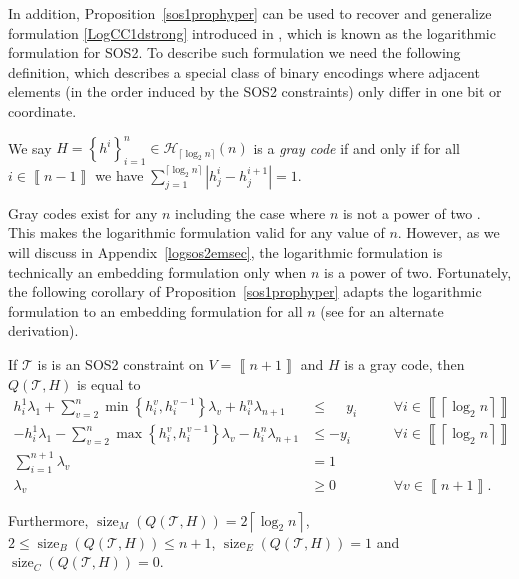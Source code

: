 \documentclass[mnsc]{informs3}
\newcommand{\set}[1]{\left\{#1\right\}}                     %
\newcommand{\abs}[1]{\left|#1\right|}                       %
\newcommand{\bra}[1]{\left(#1\right)}
\newcommand{\sidx}[1]{\left\llbracket     #1 \right\rrbracket}
\DeclareMathOperator{\size}{size}
\begin{document}
In addition, Proposition~\ref{sos1prophyper} can be used to recover and generalize formulation \eqref{LogCC1dstrong} introduced in \cite{Modeling-Disjunctive-Constraints-FULL}, which is known as the logarithmic formulation for SOS2. To describe such formulation we need the following definition, which describes a special class of binary encodings where adjacent elements (in the order induced by the SOS2 constraints) only differ in one bit or coordinate. 
\begin{definition} We say $H=\set{h^i}_{i=1}^n\in \mathcal{H}_{\lceil \log_2 n\rceil}(n)$ is a \emph{gray code} if and only if  for all $i\in \sidx{ n-1}$ we have $\sum\nolimits_{j=1}^{\lceil \log_2 n\rceil} \abs{h^{i}_j-h^{i+1}_j}=1$.
\end{definition}
Gray codes exist for any $n$ including the case where $n$ is not a power of two \cite{Wilf89}. This makes the logarithmic formulation valid for any value of $n$. However, as we will discuss in Appendix~\ref{logsos2emsec}, the logarithmic formulation is technically an embedding formulation only when  $n$ is a power of two. Fortunately, the following corollary of Proposition~\ref{sos1prophyper} adapts the logarithmic formulation to an embedding formulation for all $n$ (see \cite{MuldoonPhd} for an alternate derivation).
\begin{corollary}\label{sosub} If $\mathcal{T}$ is is an SOS2 constraint on  $V=\sidx{n+1}$ and $H$ is a gray code, then $Q\bra{\mathcal{T},H}$ is equal to  
\begin{subequations}\label{sos2formul}
\begin{alignat}{3}
h^1_i\lambda_{1}+\sum\nolimits_{v=2}^{n} \min\set{h^v_i,h^{v-1}_i}\lambda_v+h^n_i\lambda_{n+1}& \leq \phantom{-}y_i &\quad&\forall i \in \sidx{\left\lceil \log_2 n\right\rceil}\\
-h^1_i\lambda_{1}-\sum\nolimits_{v=2}^{n} \max\set{h^v_i,h^{v-1}_i}\lambda_v-h^n_i\lambda_{n+1}& \leq -y_i &\quad&\forall i \in \sidx{\left\lceil \log_2 n\right\rceil}\\
\sum\nolimits_{i=1}^{n+1} \lambda_v &=1\\
\lambda_v&\geq 0 &\quad& \forall v\in \sidx{n+1}.
\end{alignat}
\end{subequations}

Furthermore, $\size_M\bra{Q\bra{\mathcal{T},H}}=2\left\lceil \log_2 n\right\rceil$,  $2\leq \size_B\bra{Q\bra{\mathcal{T},H}}\leq n+1$, $\size_E\bra{Q\bra{\mathcal{T},H}}=1$ and  $\size_C\bra{Q\bra{\mathcal{T},H}}=0$.
\end{corollary} 
\end{document}
